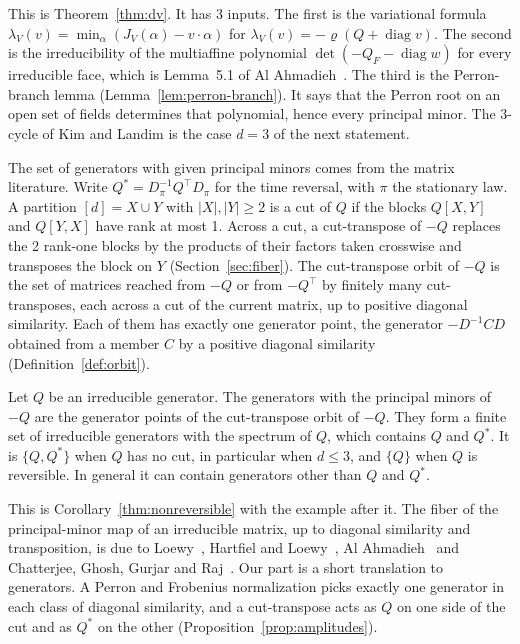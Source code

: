 This is Theorem~\ref{thm:dv}. It has 3 inputs. The first is the variational formula
$\lambda_V(v)=\min_\alpha(J_V(\alpha)-v\cdot\alpha)$ for $\lambda_V(v)=-\varrho(Q+\operatorname{diag}v)$.
The second is the irreducibility of the multiaffine polynomial $\det(-Q_F-\operatorname{diag}w)$
for every irreducible face, which is Lemma~5.1 of Al Ahmadieh~\cite{alahmadieh2023}. The third is
the Perron-branch lemma (Lemma~\ref{lem:perron-branch}). It says that the Perron root on an open
set of fields determines that polynomial, hence every principal minor. The 3-cycle of Kim and
Landim is the case $d=3$ of the next statement.

The set of generators with given principal minors comes from the matrix literature. Write
$Q^*=D_\pi^{-1}Q^\top D_\pi$ for the time reversal, with $\pi$ the stationary law. A partition
$[d]=X\cup Y$ with $|X|,|Y|\ge2$ is a cut of $Q$ if the blocks $Q[X,Y]$ and $Q[Y,X]$ have rank at
most 1. Across a cut, a cut-transpose of $-Q$ replaces the 2 rank-one blocks by the products of
their factors taken crosswise and transposes the block on $Y$ (Section~\ref{sec:fiber}). The
cut-transpose orbit of $-Q$ is the set of matrices reached from $-Q$ or from $-Q^\top$ by
finitely many cut-transposes, each across a cut of the current matrix, up to positive diagonal
similarity. Each of them has exactly one generator point, the generator $-D^{-1}CD$ obtained
from a member $C$ by a positive diagonal similarity (Definition~\ref{def:orbit}).

\begin{corollary}\label{cor:A-fiber}
Let $Q$ be an irreducible generator. The generators with the principal minors of $-Q$ are the
generator points of the cut-transpose orbit of $-Q$. They form a finite set of irreducible
generators with the spectrum of $Q$, which contains $Q$ and $Q^*$. It is $\{Q,Q^*\}$ when $Q$ has
no cut, in particular when $d\le3$, and $\{Q\}$ when $Q$ is reversible. In general it can contain
generators other than $Q$ and $Q^*$.
\end{corollary}

This is Corollary~\ref{thm:nonreversible} with the example after it. The fiber of the
principal-minor map of an irreducible matrix, up to diagonal similarity and transposition, is due
to Loewy~\cite{loewy1986}, Hartfiel and Loewy~\cite{hartfielloewy1984}, Al
Ahmadieh~\cite{alahmadieh2023} and Chatterjee, Ghosh, Gurjar and Raj~\cite{cggr2024}. Our part is
a short translation to generators. A Perron and Frobenius normalization picks exactly one
generator in each class of diagonal similarity, and a cut-transpose acts as $Q$ on one side of
the cut and as $Q^*$ on the other (Proposition~\ref{prop:amplitudes}).

